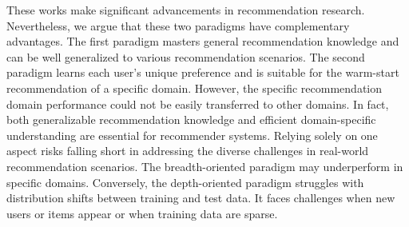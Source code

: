 These works make significant advancements in recommendation research. Nevertheless, we argue that these two paradigms have complementary advantages. The first paradigm masters general recommendation knowledge and can be well generalized to various recommendation scenarios. The second paradigm learns each user's unique preference and is suitable for the warm-start recommendation of a specific domain. However, the specific recommendation domain performance could not be easily transferred to other domains. In fact, both generalizable recommendation knowledge and efficient domain-specific understanding are essential for recommender systems. 
Relying solely on one aspect risks falling short in addressing the diverse challenges in real-world recommendation scenarios.
The breadth-oriented paradigm may underperform in specific domains. Conversely, the depth-oriented paradigm struggles with distribution shifts between training and test data. It faces challenges when new users or items appear or when training data are sparse.


